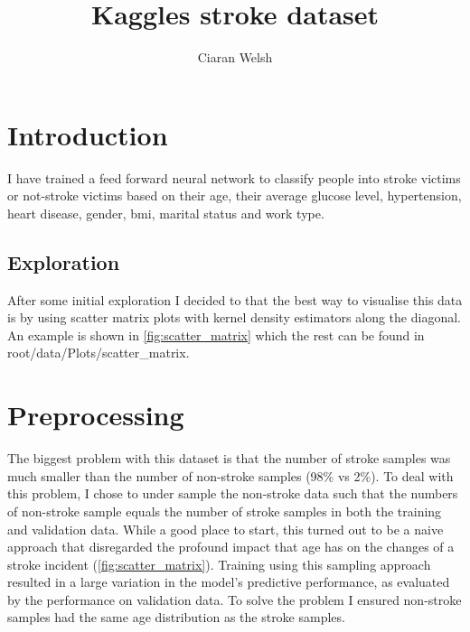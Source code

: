 \documentclass[12pt]{article}
\title{Kaggles stroke dataset}
\author{Ciaran Welsh}
\begin{document}
    \maketitle

    \section{Introduction}
    I have trained a feed forward neural network to classify people into stroke victims or not-stroke victims
    based on their age, their average glucose level, hypertension, heart disease, gender, bmi, marital status and
    work type.
    \subsection{Exploration}
    After some initial exploration I decided to that the best way to visualise this data is by
    using scatter matrix plots with kernel density estimators along the diagonal. An example is shown in
    \cref{fig:scatter_matrix} which the rest can be found in \<root\>/data/Plots/scatter\_matrix.

    \section{Preprocessing}
    The biggest problem with this dataset is that the number of stroke samples was much smaller than the number
    of non-stroke samples (98\% vs 2\%). To deal with this problem, I chose to under sample the non-stroke
    data such that the numbers of non-stroke sample equals the number of stroke samples in both the training and validation data.
    While a good place to start, this turned out to be a naive approach that disregarded the profound impact that age
    has on the changes of a stroke incident (\cref{fig:scatter_matrix}). Training using this sampling approach resulted in
    a large variation in the model's predictive performance, as evaluated by the performance on validation data. To solve the
    problem I ensured non-stroke samples had the same age distribution as the stroke samples.
\end{document}

